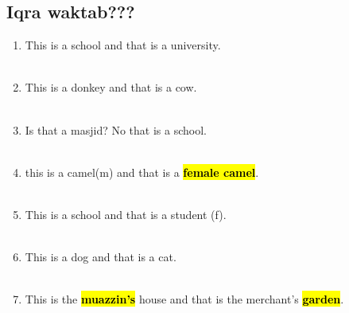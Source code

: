 \subsection{Iqra waktab???}
\begin{enumerate}
    \item This is a school and that is a university. \\[0.1in] \answerline \\[0.1in]
    \item This is a donkey and that is a cow. \\[0.1in] \answerline \\[0.1in]
    \item Is that a masjid? No that is a school. \\[0.1in] \answerline \\[0.1in]
    \item this is a camel(m) and that is a \hl{\textbf{female camel}}. \\[0.1in] \answerline \\[0.1in]
    \item This is a school and that is a student (f). \\[0.1in] \answerline \\[0.1in]
    \item This is a dog and that is a cat. \\[0.1in] \answerline \\[0.1in]
    \item This is the \hl{\textbf{muazzin's}} house and that is the merchant's \hl{\textbf{garden}}. \\[0.1in] \answerline \\[0.1in]
\end{enumerate}

